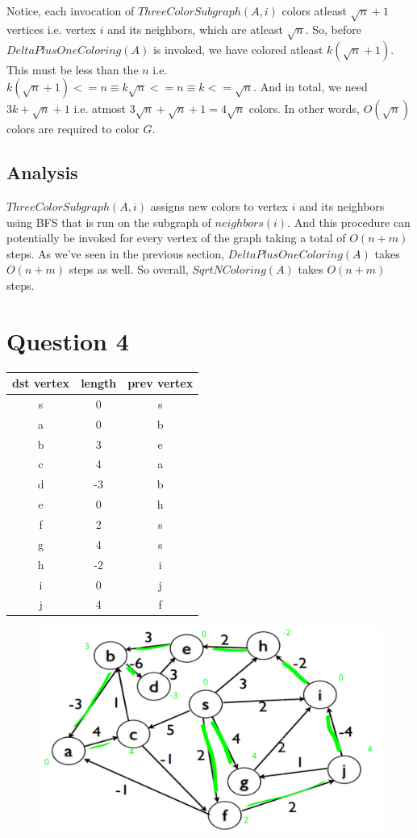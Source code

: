 \documentclass{article}
\begin{document}
Notice, each invocation of $ThreeColorSubgraph(A, i)$ colors atleast $\sqrt n + 1$ vertices i.e. vertex $i$ and its neighbors, which are atleast $\sqrt n$. So, before $DeltaPlusOneColoring(A)$ is invoked, we have colored atleast $k(\sqrt n + 1)$. This must be less than the $n$ i.e. $k(\sqrt n + 1) <= n \equiv k\sqrt n <= n \equiv k <= \sqrt n$. And in total, we need $3k + \sqrt n + 1$ i.e. atmost $3\sqrt n + \sqrt n + 1 = 4\sqrt n$ colors. In other words, $O(\sqrt n)$ colors are required to color $G$.

\subsection*{Analysis}
$ThreeColorSubgraph(A, i)$ assigns new colors to vertex $i$ and its neighbors using BFS that is run on the subgraph of $neighbors(i)$. And this procedure can potentially be invoked for every vertex of the graph taking a total of $O(n+m)$ steps. As we've seen in the previous section, $DeltaPlusOneColoring(A)$ takes $O(n+m)$ steps as well. So overall, $SqrtNColoring(A)$ takes $O(n+m)$ steps.

\section*{Question 4}

\begin{center}
\begin{tabular}{|c|c|c|}
\hline
dst vertex & length & prev vertex \\
\hline
s & 0 & s \\
\hline
a & 0 & b \\
\hline
b & 3 & e \\
\hline
c & 4 & a \\
\hline
d & -3 & b \\
\hline
e & 0 & h \\
\hline
f & 2 & s \\
\hline
g & 4 & s \\
\hline
h & -2 & i \\
\hline
i & 0 & j \\
\hline
j & 4 & f \\
\hline
\end{tabular}
\end{center}

\begin{figure}[!htb]
    \includegraphics[width=1\textwidth]{shortestPathTree.png}
\end{figure}
\end{document}
